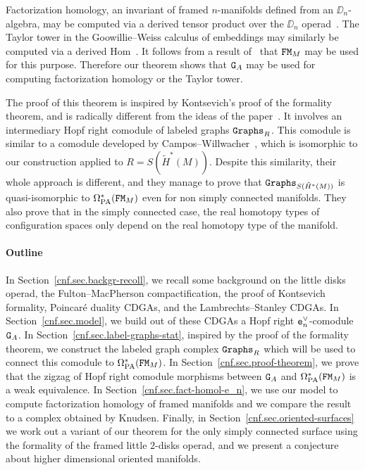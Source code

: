 Factorization homology, an invariant of framed $n$-manifolds defined from an $\DD_{n}$-algebra, may be computed via a derived tensor product over the $\DD_{n}$ operad~\cite{AyalaFrancis2015}.
The Taylor tower in the Goowillie--Weiss calculus of embeddings may similarly be computed via a derived Hom~\cite{GoodwillieWeiss1999,BoavidaWeiss2013}.
It follows from a result of~\cite[Section 5.1]{Turchin2013} that $\mathtt{FM}_{M}$ may be used for this purpose.
Therefore our theorem shows that $\mathtt{G}_{A}$ may be used for computing factorization homology or the Taylor tower.

The proof of this theorem is inspired by Kontsevich's proof of the formality theorem, and is radically different from the ideas of the paper~\cite{LambrechtsStanley2008a}.
It involves an intermediary Hopf right comodule of labeled graphs $\mathtt{Graphs}_{R}$.
This comodule is similar to a comodule developed by Campos--Willwacher~\cite{CamposWillwacher2016}, which is isomorphic to our construction applied to $R = S(\tilde{H}^{*}(M))$.
Despite this similarity, their whole approach is different, and they manage to prove that $\mathtt{Graphs}_{S(\tilde{H}^{*}(M))}$ is quasi-isomorphic to $\Omega_{\mathrm{PA}}^{*}(\mathtt{FM}_{M})$ even for non simply connected manifolds.
They also prove that in the simply connected case, the real homotopy types of configuration spaces only depend on the real homotopy type of the manifold.

\paragraph{Outline}

In Section~\ref{cnf.sec.backgr-recoll}, we recall some background on the little disks operad, the Fulton--MacPherson compactification, the proof of Kontsevich formality, Poincaré duality CDGAs, and the Lambrechts--Stanley CDGAs.
In Section~\ref{cnf.sec.model}, we build out of these CDGAs a Hopf right $\mathtt{e}_{n}^{\vee}$-comodule $\mathtt{G}_{A}$.
In Section~\ref{cnf.sec.label-graphs-stat}, inspired by the proof of the formality theorem, we construct the labeled graph complex $\mathtt{Graphs}_{R}$ which will be used to connect this comodule to $\Omega_{\mathrm{PA}}^{*}(\mathtt{FM}_{M})$.
In Section~\ref{cnf.sec.proof-theorem}, we prove that the zigzag of Hopf right comodule morphisms between $\mathtt{G}_{A}$ and $\Omega_{\mathrm{PA}}^{*}(\mathtt{FM}_{M})$ is a weak equivalence.
In Section~\ref{cnf.sec.fact-homol-e_n}, we use our model to compute factorization homology of framed manifolds and we compare the result to a complex obtained by Knudsen.
Finally, in Section~\ref{cnf.sec.oriented-surfaces} we work out a variant of our theorem for the only simply connected surface using the formality of the framed little $2$-disks operad, and we present a conjecture about higher dimensional oriented manifolds.


